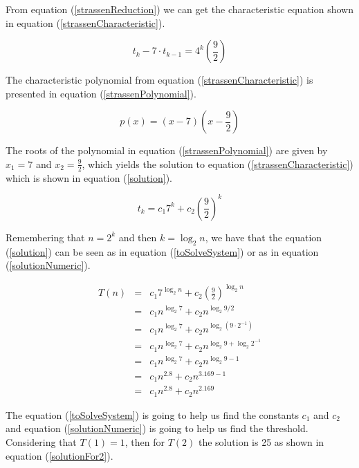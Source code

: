 \documentclass[tikz, 12pt]{scrartcl}
\begin{document}
From equation (\ref{strassenReduction}) we can get the characteristic equation shown in equation (\ref{strassenCharacteristic}).

\begin{equation}\label{strassenCharacteristic}
t_k - 7 \cdot t_{k - 1} = 4^k\left( \frac{9}{2}\right)
\end{equation}

The characteristic polynomial from equation (\ref{strassenCharacteristic}) is presented in equation (\ref{strassenPolynomial}).

\begin{equation}\label{strassenPolynomial}
p(x) = \left(x - 7\right)\left(x - \frac{9}{2}\right)
\end{equation}

The roots of the polynomial in equation (\ref{strassenPolynomial}) are given by $x_1 = 7$ and ${\displaystyle x_2 = \frac{9}{2}}$, which yields the solution to equation (\ref{strassenCharacteristic}) which is shown in equation (\ref{solution}).

\begin{equation}\label{solution}
t_k = c_1 7^k + c_2 \left( \frac{9}{2} \right)^k
\end{equation}

Remembering that $n = 2^k$ and then $k = \log_2 n$, we have that the equation (\ref{solution}) can be seen as in equation (\ref{toSolveSystem}) or as in equation (\ref{solutionNumeric}).

\begin{eqnarray}
T(n)	&	=	&	c_1 7^{\log_2 n} + c_2 \left( \frac{9}{2} \right)^{\log_2 n} \label{toSolveSystem} \\
	&	=	&	c_1 n^{\log_2 7} + c_2 n^{\log_2 9/2}	 \nonumber \\
	&	=	&	c_1 n^{\log_2 7} + c_2 n^{\log_2 \left(9 \cdot 2^{-1} \right)} \nonumber \\
	&	=	&	c_1 n^{\log_2 7} + c_2 n^{\log_2 9 + \log_2  2^{-1}} \nonumber \\
	&	=	&	c_1 n^{\log_2 7} + c_2 n^{\log_2 9 - 1} \nonumber \\
	&	=	&	c_1 n^{2.8} + c_2 n^{3.169 - 1} \nonumber \\
	&	=	&	c_1 n^{2.8} + c_2 n^{2.169} \label{solutionNumeric} 
\end{eqnarray}

The equation (\ref{toSolveSystem}) is going to help us find the constants $c_1$ and $c_2$ and equation (\ref{solutionNumeric}) is going to help us find the threshold.\\
Considering that $T(1) = 1$, then for $T(2)$ the solution is 25 as shown in equation (\ref{solutionFor2}).
\end{document}
